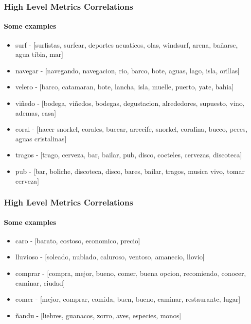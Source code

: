 \documentclass{beamer}
\begin{document}
\begin{frame}
\frametitle{High Level Metrics Correlations}
\framesubtitle{Some examples}
\small 
\begin{itemize}
  \item surf - [surfistas, surfear, deportes acuaticos, olas, windsurf, arena, bañarse, agua tibia, mar]
 \item navegar - [navegando, navegacion, rio, barco, bote, aguas, lago, isla, orillas]
 \item velero - [barco, catamaran, bote, lancha, isla, muelle, puerto, yate, bahia]
 \item viñedo - [bodega, viñedos, bodegas, degustacion, alrededores, supuesto, vino, ademas, casa]
 \item coral - [hacer snorkel, corales, bucear, arrecife, snorkel, coralina, buceo, peces, aguas cristalinas]
 \item tragos - [trago, cerveza, bar, bailar, pub, disco, cocteles, cervezas, discoteca]
 \item pub - [bar, boliche, discoteca, disco, bares, bailar, tragos, musica vivo, tomar cerveza]
\end{itemize}

\end{frame}

\begin{frame}
\frametitle{High Level Metrics Correlations}
\framesubtitle{Some examples}
\small 
\begin{itemize}
 \item caro - [barato, costoso, economico, precio]
 \item lluvioso - [soleado, nublado, caluroso, ventoso, amanecio, llovio]
 \item comprar - [compra, mejor, bueno, comer, buena opcion, recomiendo, conocer, caminar, ciudad]
 \item comer - [mejor, comprar, comida, buen, bueno, caminar, restaurante, lugar]
 \item ñandu - [liebres, guanacos, zorro, aves, especies, monos]
\end{itemize}

\end{frame}
\end{document}
